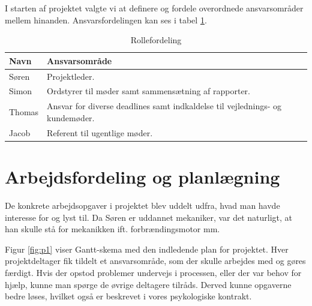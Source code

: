 I starten af projektet valgte vi at definere og fordele overordnede ansvarsområder mellem hinanden. Ansvarsfordelingen kan ses i tabel \ref{tab:rolle}.
\begin{table}[h]
  \centering
\begin{tabular}{ll}
\textbf{Navn} & \textbf{Ansvarsområde} \\
\hline
Søren & Projektleder. \\
Simon & Ordstyrer til møder samt sammensætning af rapporter. \\
Thomas & Ansvar for diverse deadlines samt indkaldelse til vejlednings- og kundemøder. \\
  Jacob & Referent til ugentlige møder. \\
  \hline
\end{tabular}
  \caption{Rollefordeling}
  \label{tab:rolle}
\end{table}

\section{Arbejdsfordeling og planlægning}
\label{sec:arbejdsfordeling:-}

De konkrete arbejdsopgaver i projektet blev uddelt udfra, hvad man havde interesse for og lyst til. Da Søren er uddannet mekaniker, var det naturligt, at han skulle stå for mekanikken ift. forbrændingsmotor mm.



Figur \ref{fig:p1} viser Gantt-skema med den indledende plan for projektet. Hver projektdeltager fik tildelt et ansvarsområde, som der skulle arbejdes med og gøres færdigt. Hvis der opstod problemer undervejs i processen, eller der var behov for hjælp, kunne man spørge de øvrige deltagere tilråds. Derved kunne opgaverne bedre løses, hvilket også er beskrevet i vores psykologiske kontrakt.

